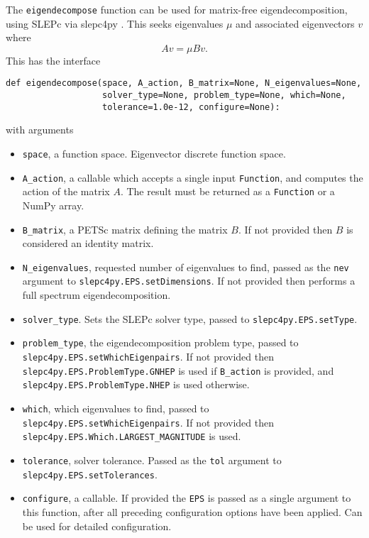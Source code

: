 \documentclass[11pt]{article}
\begin{document}
The \texttt{eigendecompose} function can be used for matrix-free
eigendecomposition, using SLEPc via slepc4py
\citep{hernandez2005,dalcin2011,slepc-user-3.9}. This seeks eigenvalues $\mu$
and associated eigenvectors $v$ where
\begin{equation*}
  A v = \mu B v.
\end{equation*}
This has the interface
\begin{lstlisting}
def eigendecompose(space, A_action, B_matrix=None, N_eigenvalues=None,
                   solver_type=None, problem_type=None, which=None,
                   tolerance=1.0e-12, configure=None):
\end{lstlisting}
with arguments
\begin{itemize}
  \item \texttt{space}, a function space. Eigenvector discrete function space.
  \item \texttt{A\_action}, a callable which accepts a single input
    \texttt{Function}, and computes the action of the matrix $A$. The result
    must be returned as a \texttt{Function} or a NumPy array.
  \item \texttt{B\_matrix}, a PETSc matrix defining the matrix $B$. If not
    provided then $B$ is considered an identity matrix.
  \item \texttt{N\_eigenvalues}, requested number of eigenvalues to find,
    passed as the \texttt{nev} argument to \texttt{slepc4py.EPS.setDimensions}.
    If not provided then performs a full spectrum eigendecomposition.
  \item \texttt{solver\_type}. Sets the SLEPc solver type, passed to
    \texttt{slepc4py.EPS.setType}.
  \item \texttt{problem\_type}, the eigendecomposition problem type, passed to
    \texttt{slepc4py.EPS.setWhichEigenpairs}. If not provided then
    \texttt{slepc4py.EPS.ProblemType.GNHEP} is used if \texttt{B\_action} is
    provided, and \texttt{slepc4py.EPS.ProblemType.NHEP} is used otherwise.
  \item \texttt{which}, which eigenvalues to find, passed to
    \texttt{slepc4py.EPS.setWhichEigenpairs}. If not provided then
    \texttt{slepc4py.EPS.Which.LARGEST\_MAGNITUDE} is used.
  \item \texttt{tolerance}, solver tolerance. Passed as the \texttt{tol}
   argument to \texttt{slepc4py.EPS.setTolerances}.
  \item \texttt{configure}, a callable. If provided the \texttt{EPS} is passed
    as a single argument to this function, after all preceding configuration
    options have been applied. Can be used for detailed configuration.
\end{itemize}
\end{document}
